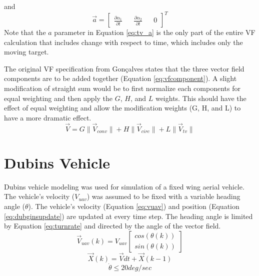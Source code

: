 \documentclass[conf]{new-aiaa}
\begin{document}
and
\begin{equation}\label{eq:tv_a}
\overrightarrow{a} = \begin{bmatrix} \frac{\partial\alpha_1}{\partial t} &&  \frac{\partial\alpha_2}{\partial t} && 0\end{bmatrix}^T
\end{equation}
Note that the $a$ parameter in Equation \ref{eq:tv_a} is the only part of the entire VF calculation that includes change with respect to time, which includes only the moving target.

The original VF specification from Gon\c{c}alves states that the three vector field components are to be added together (Equation \ref{eq:vfcomponent}). A slight modification of straight sum would be to first normalize each components for equal weighting and then apply the $G$, $H$, and $L$ weights. This should have the effect of equal weighting and allow the modification weights (G, H, and L) to have a more dramatic effect.
\begin{equation}\label{eq:vfcomponentmod}
\overrightarrow{V} = G \lVert \overrightarrow{V}_{conv} \rVert+ H \lVert \overrightarrow{V}_{circ} \rVert + L \lVert \overrightarrow{V}_{tv}\rVert
\end{equation}

\section{Dubins Vehicle}
Dubins vehicle modeling was used for simulation of a fixed wing aerial vehicle. The vehicle's velocity ($V_{uav}$) was assumed to be fixed with a variable heading angle ($\theta$). The vehicle's velocity (Equation \ref{eq:vuav}) and position (Equation \ref{eq:dubginsupdate}) are updated at every time step. The heading angle is limited by Equation \ref{eq:turnrate} and directed by the angle of the vector field.
\begin{equation}\label{eq:vuav}
\overrightarrow{V}_{uav}(k) =  V_{uav} \begin{bmatrix} cos(\theta(k)) \\ sin(\theta(k)) \end{bmatrix}
\end{equation}
\begin{equation}\label{eq:dubginsupdate}
\overrightarrow{X}(k) =  \overrightarrow{V} dt + \overrightarrow{X}(k-1) 
\end{equation}
\begin{equation}\label{eq:turnrate}
\dot{\theta} \le 20 deg/sec
\end{equation}
\end{document}
